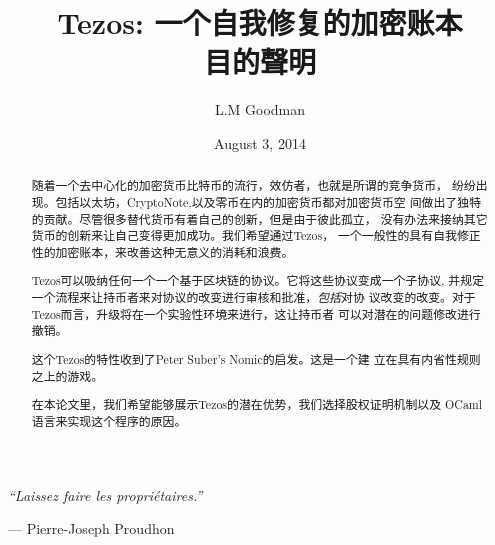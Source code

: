 \documentclass[letterpaper]{article}
\author{L.M Goodman}
\date{August 3, 2014}
\title{Tezos: 一个自我修复的加密账本 \\ 目的聲明}
\begin{document}
\maketitle



\epigraph{\emph{``Laissez faire les propri\'{e}taires.''}}
{--- \textup{Pierre-Joseph Proudhon}}

\begin{abstract}
随着一个去中心化的加密货币比特币的流行，效仿者，也就是所谓的竞争货币，
纷纷出现。包括以太坊，CryptoNote,以及零币在内的加密货币都对加密货币空
间做出了独特的贡献。尽管很多替代货币有着自己的创新，但是由于彼此孤立，
没有办法来接纳其它货币的创新来让自己变得更加成功。我们希望通过Tezos，
一个一般性的具有自我修正性的加密账本，来改善这种无意义的消耗和浪费。

Tezos可以吸纳任何一个一个基于区块链的协议。它将这些协议变成一个子协议,
并规定一个流程来让持币者来对协议的改变进行审核和批准，\emph{包括}对协
议改变的改变。对于Tezos而言，升级将在一个实验性环境来进行，这让持币者
可以对潜在的问题修改进行撤销。

这个Tezos的特性收到了Peter Suber’s Nomic\cite{Nomic}的启发。这是一个建
立在具有内省性规则之上的游戏。

在本论文里，我们希望能够展示Tezos的潜在优势，我们选择股权证明机制以及
OCaml语言来实现这个程序的原因。


\end{abstract}
\newpage
\tableofcontents
\end{document}

